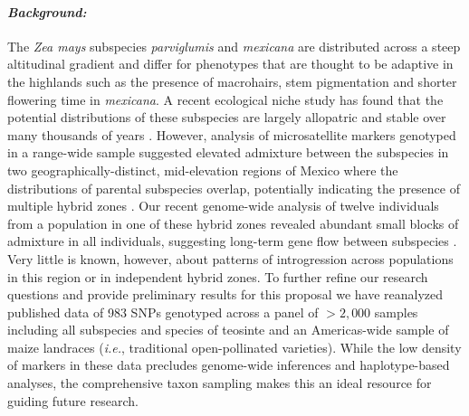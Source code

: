 \paragraph{\emph{Background:}} 
The \emph {Zea mays} subspecies \emph{parviglumis} and \emph{mexicana} are distributed across a steep altitudinal gradient and differ for phenotypes that are thought to be adaptive in the highlands such as the presence of macrohairs, stem pigmentation and shorter flowering time in \emph{mexicana}.
A recent ecological niche study has found that the potential distributions of these subspecies are largely allopatric and stable over many thousands of years \citep{hufford2012inferences}.
However, analysis of microsatellite markers genotyped in a range-wide sample suggested elevated admixture between the subspecies in two geographically-distinct, mid-elevation regions of Mexico where the distributions of parental subspecies overlap, potentially indicating the presence of multiple hybrid zones \citep{Fukunaga2005}.  
Our recent genome-wide analysis of twelve individuals from a population in one of these hybrid zones revealed abundant small blocks of admixture in all individuals, suggesting long-term gene flow between subspecies \citep{Pyhajarvi2013}.  
Very little is known, however, about patterns of introgression across populations in this region or in independent hybrid zones.
To further refine our research questions and provide preliminary results for this proposal we have reanalyzed published data \citep{Fang2012} of 983 SNPs genotyped across a panel of $>2,000$ samples including all subspecies and species of teosinte and an Americas-wide sample of maize landraces (\emph{i.e.}, traditional open-pollinated varieties).
While the low density of markers in these data precludes genome-wide inferences and haplotype-based analyses, the comprehensive taxon sampling makes this an ideal resource for guiding future research.

